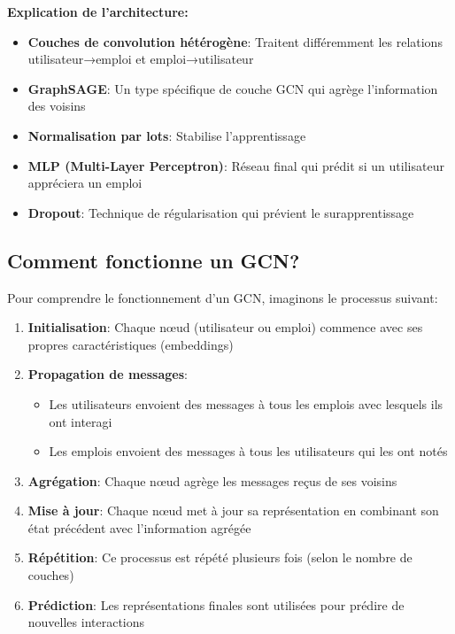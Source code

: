 \documentclass[12pt,a4paper]{article}
\begin{document}
\begin{infobox}
\textbf{Explication de l'architecture:}
\begin{itemize}
    \item \textbf{Couches de convolution hétérogène}: Traitent différemment les relations utilisateur→emploi et emploi→utilisateur
    \item \textbf{GraphSAGE}: Un type spécifique de couche GCN qui agrège l'information des voisins
    \item \textbf{Normalisation par lots}: Stabilise l'apprentissage
    \item \textbf{MLP (Multi-Layer Perceptron)}: Réseau final qui prédit si un utilisateur appréciera un emploi
    \item \textbf{Dropout}: Technique de régularisation qui prévient le surapprentissage
\end{itemize}
\end{infobox}

\subsection{Comment fonctionne un GCN?}

Pour comprendre le fonctionnement d'un GCN, imaginons le processus suivant:

\begin{enumerate}
    \item \textbf{Initialisation}: Chaque nœud (utilisateur ou emploi) commence avec ses propres caractéristiques (embeddings)
    \item \textbf{Propagation de messages}: 
    \begin{itemize}
        \item Les utilisateurs envoient des messages à tous les emplois avec lesquels ils ont interagi
        \item Les emplois envoient des messages à tous les utilisateurs qui les ont notés
    \end{itemize}
    \item \textbf{Agrégation}: Chaque nœud agrège les messages reçus de ses voisins
    \item \textbf{Mise à jour}: Chaque nœud met à jour sa représentation en combinant son état précédent avec l'information agrégée
    \item \textbf{Répétition}: Ce processus est répété plusieurs fois (selon le nombre de couches)
    \item \textbf{Prédiction}: Les représentations finales sont utilisées pour prédire de nouvelles interactions
\end{enumerate}
\end{document}
